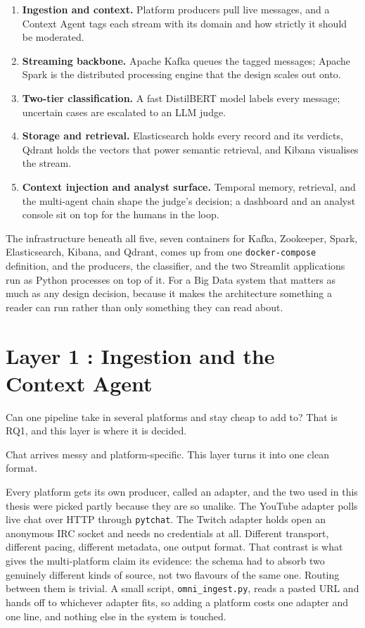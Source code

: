 \begin{enumerate}
\def\labelenumi{\arabic{enumi}.}
\tightlist
\item \textbf{Ingestion and context.} Platform producers pull live messages, and a Context Agent tags each stream with its domain and how strictly it should be moderated.
\item \textbf{Streaming backbone.} Apache Kafka queues the tagged messages; Apache Spark is the distributed processing engine that the design scales out onto.
\item \textbf{Two-tier classification.} A fast DistilBERT model labels every message; uncertain cases are escalated to an LLM judge.
\item \textbf{Storage and retrieval.} Elasticsearch holds every record and its verdicts, Qdrant holds the vectors that power semantic retrieval, and Kibana visualises the stream.
\item \textbf{Context injection and analyst surface.} Temporal memory, retrieval, and the multi-agent chain shape the judge's decision; a dashboard and an analyst console sit on top for the humans in the loop.
\end{enumerate}

The infrastructure beneath all five, seven containers for Kafka, Zookeeper, Spark, Elasticsearch, Kibana, and Qdrant, comes up from one \texttt{docker-compose} definition, and the producers, the classifier, and the two Streamlit applications run as Python processes on top of it. For a Big Data system that matters as much as any design decision, because it makes the architecture something a reader can run rather than only something they can read about.

\section{Layer 1 : Ingestion and the Context Agent}\label{layer-1-ingestion-and-the-context-agent}

Can one pipeline take in several platforms and stay cheap to add to? That is RQ1, and this layer is where it is decided.

Chat arrives messy and platform-specific. This layer turns it into one clean format.

Every platform gets its own producer, called an adapter, and the two used in this thesis were picked partly because they are so unalike. The YouTube adapter polls live chat over HTTP through \texttt{pytchat}. The Twitch adapter holds open an anonymous IRC socket and needs no credentials at all. Different transport, different pacing, different metadata, one output format. That contrast is what gives the multi-platform claim its evidence: the schema had to absorb two genuinely different kinds of source, not two flavours of the same one. Routing between them is trivial. A small script, \texttt{omni\_ingest.py}, reads a pasted URL and hands off to whichever adapter fits, so adding a platform costs one adapter and one line, and nothing else in the system is touched.

